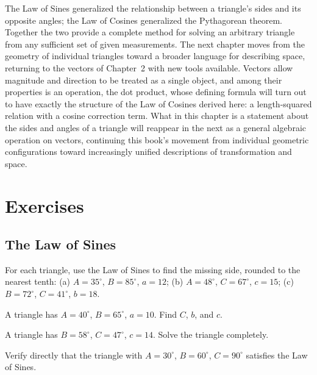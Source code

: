 The Law of Sines generalized the relationship between a triangle's sides
and its opposite angles; the Law of Cosines generalized the Pythagorean
theorem. Together the two provide a complete method for solving an
arbitrary triangle from any sufficient set of given measurements. The next
chapter moves from the geometry of individual triangles toward a broader
language for describing space, returning to the vectors of Chapter~2 with
new tools available. Vectors allow magnitude and direction to be treated
as a single object, and among their properties is an operation, the dot
product, whose defining formula will turn out to have exactly the
structure of the Law of Cosines derived here: a length-squared relation
with a cosine correction term. What in this chapter is a statement about
the sides and angles of a triangle will reappear in the next as a general
algebraic operation on vectors, continuing this book's movement from
individual geometric configurations toward increasingly unified
descriptions of transformation and space.

\section{Exercises}

\subsection*{The Law of Sines}
\begin{exercise}
For each triangle, use the Law of Sines to find the missing side, rounded
to the nearest tenth: (a) $A=35^\circ$, $B=85^\circ$, $a=12$; (b)
$A=48^\circ$, $C=67^\circ$, $c=15$; (c) $B=72^\circ$, $C=41^\circ$,
$b=18$.
\end{exercise}

\begin{exercise}
A triangle has $A = 40^\circ$, $B = 65^\circ$, $a = 10$. Find $C$, $b$,
and $c$.
\end{exercise}

\begin{exercise}
A triangle has $B = 58^\circ$, $C = 47^\circ$, $c = 14$. Solve the
triangle completely.
\end{exercise}

\begin{exercise}
Verify directly that the triangle with $A = 30^\circ$, $B = 60^\circ$, $C
= 90^\circ$ satisfies the Law of Sines.
\end{exercise}

